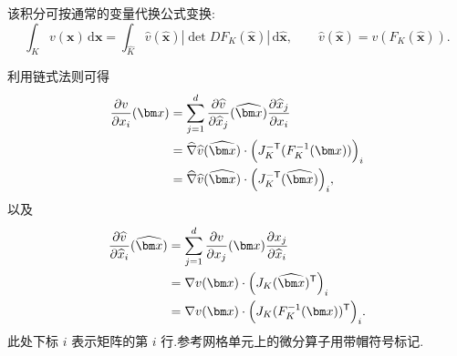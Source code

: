 \begin{note}[不含导数的函数积分]\label{note:appendix-b-58}
该积分可按通常的变量代换公式变换:
\begin{equation}\label{eq:appendix-b-26}
 \int_K v(\bm x)\,\mathrm d\bm x
 =\int_{\widehat K}\widehat v(\widehat{\bm x})
   \left|\det DF_K(\widehat{\bm x})\right|\,
   \mathrm d\widehat{\bm x},
 \qquad
 \widehat v(\widehat{\bm x})=v(F_K(\widehat{\bm x})).
\end{equation}
\end{note}

\begin{note}[导数的变换]\label{note:appendix-b-59}
利用链式法则可得
\begin{equation}\label{eq:appendix-b-27}
\begin{aligned}
 \frac{\partial v}{\partial x_i}(\bm x)
 &=\sum_{j=1}^d
   \frac{\partial\widehat v}{\partial\widehat x_j}(\widehat{\bm x})
   \frac{\partial\widehat x_j}{\partial x_i}\\
 &=\widehat\nabla\widehat v(\widehat{\bm x})\cdot
   \Bigl(J_K^{-\mathsf T}(F_K^{-1}(\bm x))\Bigr)_i\\
 &=\widehat\nabla\widehat v(\widehat{\bm x})\cdot
   \Bigl(J_K^{-\mathsf T}(\widehat{\bm x})\Bigr)_i,
\end{aligned}
\end{equation}
以及
\begin{equation}\label{eq:appendix-b-28}
\begin{aligned}
 \frac{\partial\widehat v}{\partial\widehat x_i}(\widehat{\bm x})
 &=\sum_{j=1}^d
   \frac{\partial v}{\partial x_j}(\bm x)
   \frac{\partial x_j}{\partial\widehat x_i}\\
 &=\nabla v(\bm x)\cdot
   \Bigl(J_K(\widehat{\bm x})^{\mathsf T}\Bigr)_i\\
 &=\nabla v(\bm x)\cdot
   \Bigl(J_K(F_K^{-1}(\bm x))^{\mathsf T}\Bigr)_i.
\end{aligned}
\end{equation}
此处下标 $i$ 表示矩阵的第 $i$ 行.参考网格单元上的微分算子用带帽符号标记.
\end{note}


